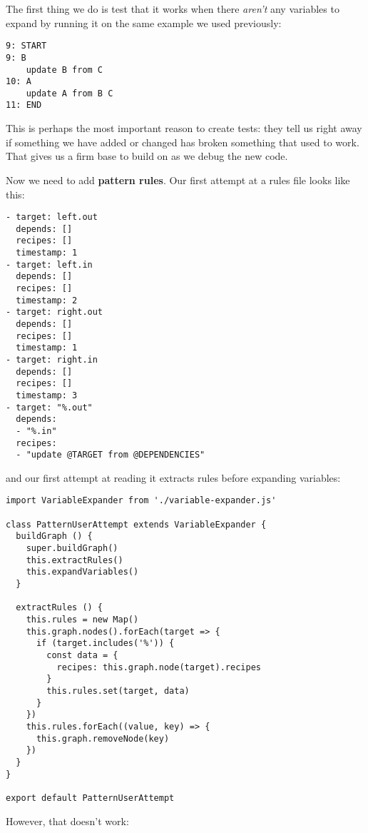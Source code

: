 \documentclass[krantzl]{krantz}
\newcommand{\glossref}[1]{\textbf{#1}}
\begin{document}
The first thing we do is test that it works when there \emph{aren't} any variables to expand
by running it on the same example we used previously:


\begin{lstlisting}[frame=single,frameround=tttt]
9: START
9: B
    update B from C
10: A
    update A from B C
11: END
\end{lstlisting}



\noindent This is perhaps the most important reason to create tests:
they tell us right away if something we have added or changed
has broken something that used to work.
That gives us a firm base to build on as we debug the new code.


Now we need to add \glossref{pattern rules}.
Our first attempt at a rules file looks like this:


\begin{lstlisting}[frame=single,frameround=tttt]
- target: left.out
  depends: []
  recipes: []
  timestamp: 1
- target: left.in
  depends: []
  recipes: []
  timestamp: 2
- target: right.out
  depends: []
  recipes: []
  timestamp: 1
- target: right.in
  depends: []
  recipes: []
  timestamp: 3
- target: "%.out"
  depends:
  - "%.in"
  recipes:
  - "update @TARGET from @DEPENDENCIES"
\end{lstlisting}



\noindent and our first attempt at reading it extracts rules before expanding variables:


\begin{lstlisting}[frame=single,frameround=tttt]
import VariableExpander from './variable-expander.js'

class PatternUserAttempt extends VariableExpander {
  buildGraph () {
    super.buildGraph()
    this.extractRules()
    this.expandVariables()
  }

  extractRules () {
    this.rules = new Map()
    this.graph.nodes().forEach(target => {
      if (target.includes('%')) {
        const data = {
          recipes: this.graph.node(target).recipes
        }
        this.rules.set(target, data)
      }
    })
    this.rules.forEach((value, key) => {
      this.graph.removeNode(key)
    })
  }
}

export default PatternUserAttempt
\end{lstlisting}



However,
that doesn't work:
\end{document}
